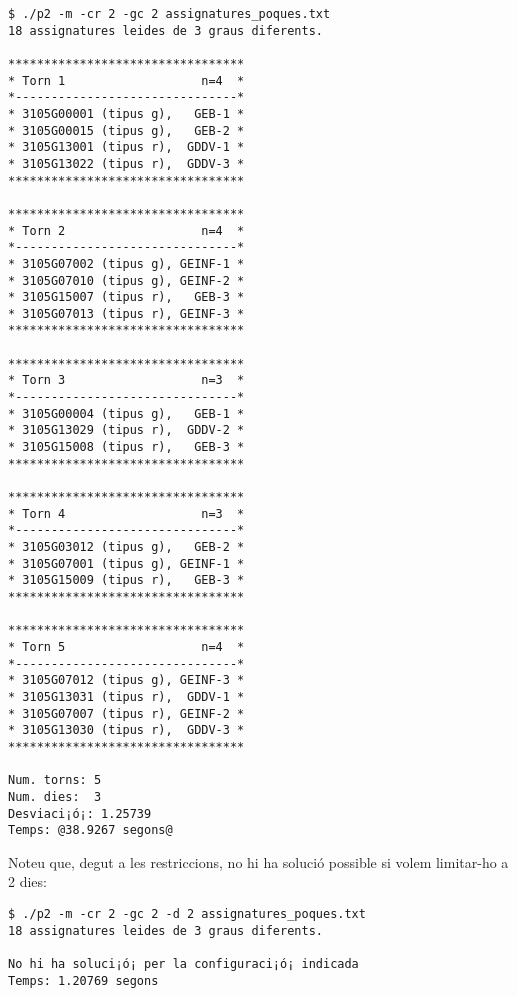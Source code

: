 \documentclass[10pt,a4paper]{../documents/class_material_assignatura_udg}
\begin{document}
\begin{lstlisting}[style=codibash]
$ ./p2 -m -cr 2 -gc 2 assignatures_poques.txt
18 assignatures leides de 3 graus diferents.

*********************************
* Torn 1                   n=4  *
*-------------------------------*
* 3105G00001 (tipus g),   GEB-1 *
* 3105G00015 (tipus g),   GEB-2 *
* 3105G13001 (tipus r),  GDDV-1 *
* 3105G13022 (tipus r),  GDDV-3 *
*********************************

*********************************
* Torn 2                   n=4  *
*-------------------------------*
* 3105G07002 (tipus g), GEINF-1 *
* 3105G07010 (tipus g), GEINF-2 *
* 3105G15007 (tipus r),   GEB-3 *
* 3105G07013 (tipus r), GEINF-3 *
*********************************

*********************************
* Torn 3                   n=3  *
*-------------------------------*
* 3105G00004 (tipus g),   GEB-1 *
* 3105G13029 (tipus r),  GDDV-2 *
* 3105G15008 (tipus r),   GEB-3 *
*********************************

*********************************
* Torn 4                   n=3  *
*-------------------------------*
* 3105G03012 (tipus g),   GEB-2 *
* 3105G07001 (tipus g), GEINF-1 *
* 3105G15009 (tipus r),   GEB-3 *
*********************************

*********************************
* Torn 5                   n=4  *
*-------------------------------*
* 3105G07012 (tipus g), GEINF-3 *
* 3105G13031 (tipus r),  GDDV-1 *
* 3105G07007 (tipus r), GEINF-2 *
* 3105G13030 (tipus r),  GDDV-3 *
*********************************

Num. torns: 5
Num. dies:  3
Desviaci¡ó¡: 1.25739
Temps: @38.9267 segons@
\end{lstlisting}

Noteu que, degut a les restriccions, no hi ha solució possible si volem limitar-ho a 2 dies:
\begin{lstlisting}[style=codibash]
$ ./p2 -m -cr 2 -gc 2 -d 2 assignatures_poques.txt
18 assignatures leides de 3 graus diferents.

No hi ha soluci¡ó¡ per la configuraci¡ó¡ indicada
Temps: 1.20769 segons
\end{lstlisting}
\end{document}
